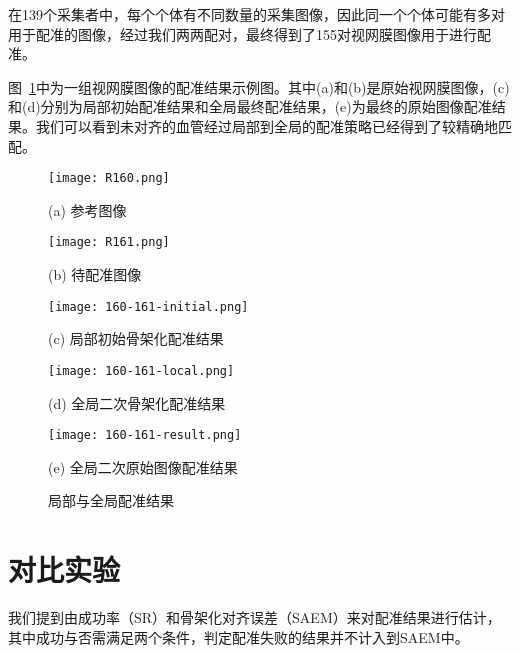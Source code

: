 在139个采集者中，每个个体有不同数量的采集图像，因此同一个个体可能有多对用于配准的图像，经过我们两两配对，最终得到了155对视网膜图像用于进行配准。

图~\ref{twiceresult}中为一组视网膜图像的配准结果示例图。其中(a)和(b)是原始视网膜图像，(c)和(d)分别为局部初始配准结果和全局最终配准结果，(e)为最终的原始图像配准结果。我们可以看到未对齐的血管经过局部到全局的配准策略已经得到了较精确地匹配。

\begin{figure}
\centering
\begin{minipage}[b]{0.45\linewidth} 
      \centering 
      \texttt{[image: R160.png]}
        \centerline{(a) 参考图像}\medskip
\end{minipage}
  \begin{minipage}[b]{0.45\linewidth}
    \centering
    \texttt{[image: R161.png]}
      \centerline{(b) 待配准图像}\medskip
  \end{minipage}
    \begin{minipage}[b]{0.45\linewidth}
    \centering
    \texttt{[image: 160-161-initial.png]}
      \centerline{(c) 局部初始骨架化配准结果}\medskip
  \end{minipage}
  \begin{minipage}[b]{0.45\linewidth}
    \centering
    \texttt{[image: 160-161-local.png]}
      \centerline{(d) 全局二次骨架化配准结果}\medskip
  \end{minipage}
   \begin{minipage}[b]{0.45\linewidth}
    \centering
    \texttt{[image: 160-161-result.png]}
      \centerline{(e) 全局二次原始图像配准结果}\medskip
  \end{minipage}
 \caption{局部与全局配准结果}
\label{twiceresult}
\end{figure}


\section{对比实验}
我们提到由成功率（SR）和骨架化对齐误差（SAEM）来对配准结果进行估计，其中成功与否需满足两个条件，判定配准失败的结果并不计入到SAEM中。
